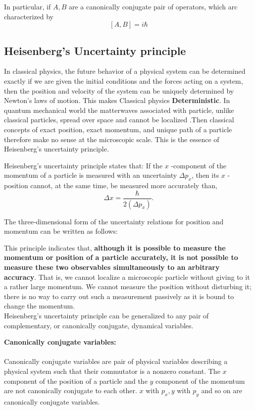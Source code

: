 In particular, if $A, B$ are a canonically conjugate pair of operators, which arc characterized by
$$
[A, B]=i \hbar
$$
\subsection{Heisenberg's Uncertainty principle}
In classical physics, the future behavior  of a physical system can be determined exactly if we are given the  initial conditions and the forces acting on a system, then the position and velocity of the system can be uniquely determined by Newton's laws of motion. This makes Classical physics \textbf{Deterministic}. In quantum mechanical world the matterwaves associated with particle, unlike classical particles, spread over space and cannot be localized .Then classical concepts of exact position,
exact momentum, and unique path of a particle therefore make no sense at the microscopic
scale. This is the essence of Heisenberg’s uncertainty principle.

\begin{definition}
	Heisenberg's uncertainty principle states that: If the $x$ -component of the momentum of a particle is measured with an uncertainty $\Delta p_{x}$, then its $x$ -position cannot, at the same time, be measured more accurately than, $$\Delta x=\frac{\hbar}{2 \left( \Delta p_{x}\right)}  .$$ 
\end{definition}
The three-dimensional form of the uncertainty relations for position and momentum can be written as follows:
\begin{center}
\end{center}
This principle indicates that, \textbf{although it is possible to measure the momentum or position
	of a particle accurately, it is not possible to measure these two observables simultaneously to
	an arbitrary accuracy}. That is, we cannot localize a microscopic particle without giving to it
a rather large momentum. We cannot measure the position without disturbing it; there is no
way to carry out such a measurement passively as it is bound to change the momentum.\\ Heisenberg’s uncertainty principle can be generalized to any pair of complementary, or
canonically conjugate, dynamical variables.
\begin{note}\hspace{0.2cm}\textbf{\large Canonically conjugate variables:}\\\\
	Canonically conjugate variables are pair of physical variables describing a physical system such that their commutator is a nonzero constant. The $ x $
	component of the position of a particle and the $ y $ component of the momentum are not canonically conjugate to
	each other. $ x $ with $ p_x, y $ with $ p_y $ and so on are canonically conjugate variables.
\end{note}
